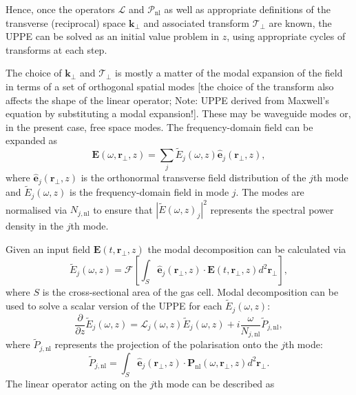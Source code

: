 \documentclass[a4paper]{jpconf}
\begin{document}
Hence, once the operators $\mathcal{L}$ and $\mathcal{P}_\text{nl}$ as well as appropriate definitions of the transverse (reciprocal) space $\mathbf{k}_\perp$ and associated transform $\mathcal{T}_\perp$ are known, the UPPE can be solved as an initial value problem in $z$, using appropriate cycles of transforms at each step. \par 
The choice of $\mathbf{k}_\perp$ and $\mathcal{T}_\perp$ is mostly a matter of the modal expansion of the field in terms of a set of orthogonal spatial modes [the choice of the transform also affects the shape of the linear operator; Note: UPPE derived from Maxwell's equation by substituting a modal expansion!]. These may be waveguide modes or, in the present case, free space modes. The frequency-domain field can be expanded as 
\begin{equation}
\mathbf{E}(\omega, \mathbf{r}_\perp, z) = \sum_j \tilde{E}_j (\omega,z)  \hat{\mathbf{e}}_j (\mathbf{r}_\perp, z),
\end{equation}
where $\hat{\mathbf{e}}_j (\mathbf{r}_\perp, z)$ is the orthonormal transverse field distribution of the $j$th mode and $\tilde{E}_j (\omega,z)$ is the frequency-domain field in mode $j$. The modes are normalised via $N_{j, \text{nl}}$ to ensure that $|\tilde{E}(\omega,z)_j|^2$ represents the spectral power density in the $j$th mode. \par 
Given an input field $\mathbf{E}(t, \mathbf{r}_\perp, z)$ the modal decomposition can be calculated via 
\begin{equation}
\tilde{E}_j (\omega,z) = \mathcal{F}\left[ \int_S \hat{\mathbf{e}}_j(\mathbf{r}_\perp,z) \cdot \mathbf{E}(t, \mathbf{r}_\perp, z) d^2 \mathbf{r}_\perp \right],
\end{equation}
where $S$ is the cross-sectional area of the gas cell. Modal decomposition can be used to solve  a scalar version of the UPPE for each $\tilde{E}_j(\omega,z)$:
\begin{equation}
\frac{\partial}{\partial z} \tilde{E}_j(\omega,z) = \mathcal{L}_j (\omega,z) \tilde{E}_j(\omega,z)+ i\frac{\omega}{N_{j, \text{nl}}} \tilde{P}_{j,\text{nl}},
\end{equation}
where $\tilde{P}_{j,\text{nl}}$ represents the projection of the polarisation onto the $j$th mode:
\begin{equation}
\tilde{P}_{j, \text{nl}} = \int_S \hat{\mathbf{e}}_j(\mathbf{r}_\perp,z) \cdot \mathbf{P}_{\text{nl}}(\omega, \mathbf{r}_\perp, z) d^2 \mathbf{r}_\perp.
\end{equation}
The linear operator acting on the $j$th mode can be described as 
\end{document}

